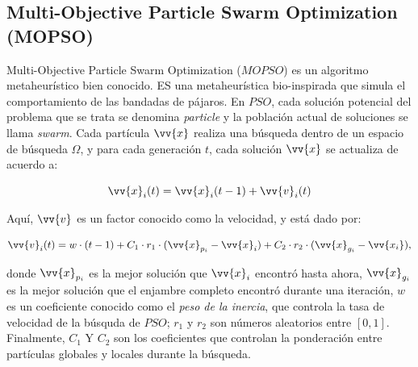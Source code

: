 \subsection{Multi-Objective Particle Swarm Optimization (MOPSO)}

Multi-Objective Particle Swarm Optimization ($MOPSO$) \cite{nebro2009smpso} es un algoritmo metaheurístico bien conocido. ES una metaheurística bio-inspirada que simula el comportamiento de las bandadas de pájaros. En $PSO$, cada solución potencial del problema que se trata se denomina \textit{particle} y la población actual de soluciones se llama \textit{swarm}. Cada partícula $\vv{x}$ realiza una búsqueda dentro de un espacio de búsqueda $\Omega$, y para cada generación $t$, cada solución $\vv{x}$ se actualiza de acuerdo a: 


\begin{equation}\label{eq:posicion1}
\vv{x}_i(t) = \vv{x}_i(t-1) + \vv{v}_i(t)
\end{equation}



Aquí, $\vv{v}$ es un factor conocido como la velocidad, y está dado por:

\begin{equation}\label{eq:velocidad1}
\vv{v}_i(t) = w \cdot (t-1) + C_1 \cdot r_1 \cdot (\vv{x}_{p_i} - \vv{x}_i) + C_2 \cdot r_2 \cdot (\vv{x}_{g_i} - \vv{x_i}) \text{,}
\end{equation}

donde $\vv{x}_{p_i}$ es la mejor solución que $\vv{x}_i$ encontró hasta ahora, $\vv{x}_{g_i}$ es la mejor solución que el enjambre completo encontró durante una iteración, $w$ es un coeficiente conocido como el \textit{peso de la inercia}, que controla la tasa de velocidad de la búsquda de $PSO$; $r_1$ y $r_2$ son números aleatorios entre $[0,1]$. Finalmente, $C_1$ Y $C_2$ son los coeficientes que controlan la ponderación entre partículas globales y locales durante la búsqueda.

